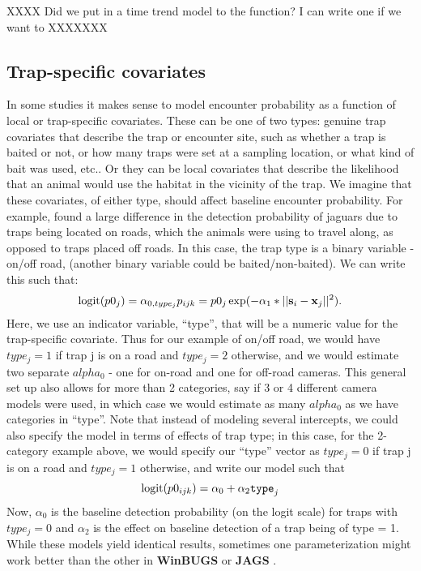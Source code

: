 XXXX Did we put in a time trend model to the function?  I can write one
if we want to XXXXXXX



\subsection{Trap-specific covariates}

In some studies it makes sense to model encounter probability as a
function of local or trap-specific covariates. These can be one of two
types: genuine trap covariates that describe the trap or encounter site,
such as whether a trap is baited or not, or how many traps were set at a sampling location,
or what kind of bait was used, etc.. Or they can be local covariates that
describe the likelihood that an animal would use the habitat in the
vicinity of the trap.
We imagine that these covariates, of either type, should affect
baseline encounter probability.
For example, \citet{sollmann_etal:2011}
found a large difference in the detection probability of jaguars due to traps
being located on roads, which the animals were using to travel along, as
opposed to traps placed off roads.  In this case, the trap
type is a binary variable - on/off road,
(another binary variable could be baited/non-baited).  We can write this such that:
\[
\mbox{logit}(p0_{j}) = \alpha_{0,type_j} 
p_{ijk} = p0_{j} \exp(- \alpha_1*||{\bf s}_{i}-{\bf x}_{j}||^2).
\]
Here, we use an indicator variable, ``type'', that will be a numeric
value for the trap-specific covariate.  Thus for our example of on/off
road, we would have $type_j = 1$ if trap j is on a road and $type_j =
2$ otherwise, and we would estimate two separate $alpha_{0}$ - one for
on-road and one for off-road cameras.  This general set up also allows
for more than 2 categories, say if 3 or 4 different camera models were
used, in which case we would estimate as many $alpha_{0}$ as we have
categories in ``type''. Note that instead of modeling several
intercepts, we could also specify the model in terms of effects of
trap type; in this case, for the 2-category example above, we would
specify our ``type'' vector as $type_j = 0$ if trap j is on a road and
$type_j = 1$ otherwise, and write our model such that
\[
\mbox{logit}(p0_{ijk}) = \alpha_{0} + \alpha_{2} \mbox{\tt type}_{j}
\]
Now, $\alpha_{0}$ is the baseline detection probability (on the logit
scale) for traps with $type_j = 0$ and $\alpha_{2}$ is the effect on
baseline detection of a trap being of type = 1. While these models
yield identical results, sometimes one parameterization might work
better than the other in {\bf WinBUGS} or {\bf JAGS}
\citep{kery:2010}.
 
